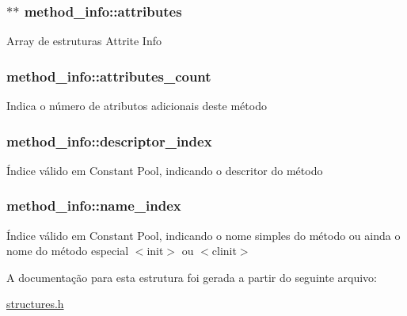\subsubsection[{\texorpdfstring{attributes}{attributes}}]{$\ast$$\ast$ method\+\_\+info\+::attributes}\hypertarget{structmethod__info_ab6e323f51c4f05e92c09e3ac5e7e07dc}{}\label{structmethod__info_ab6e323f51c4f05e92c09e3ac5e7e07dc}
Array de estruturas Attrite Info 
\subsubsection[{\texorpdfstring{attributes\+\_\+count}{attributes_count}}]{ method\+\_\+info\+::attributes\+\_\+count}\hypertarget{structmethod__info_ad9e5e1e2fc850806addadd6deab8565d}{}\label{structmethod__info_ad9e5e1e2fc850806addadd6deab8565d}
Indica o número de atributos adicionais deste método 
\subsubsection[{\texorpdfstring{descriptor\+\_\+index}{descriptor_index}}]{ method\+\_\+info\+::descriptor\+\_\+index}\hypertarget{structmethod__info_a7713103e0c8d060630ad62774fb9be37}{}\label{structmethod__info_a7713103e0c8d060630ad62774fb9be37}
Índice válido em Constant Pool, indicando o descritor do método 
\subsubsection[{\texorpdfstring{name\+\_\+index}{name_index}}]{ method\+\_\+info\+::name\+\_\+index}\hypertarget{structmethod__info_ab91d62d0658b77bba83f6bb685e3bbb9}{}\label{structmethod__info_ab91d62d0658b77bba83f6bb685e3bbb9}
Índice válido em Constant Pool, indicando o nome simples do método ou ainda o nome do método especial $<$init$>$ ou $<$clinit$>$ 

A documentação para esta estrutura foi gerada a partir do seguinte arquivo\+:\begin{DoxyCompactItemize}
\item 
\hyperlink{structures_8h}{structures.\+h}\end{DoxyCompactItemize}
